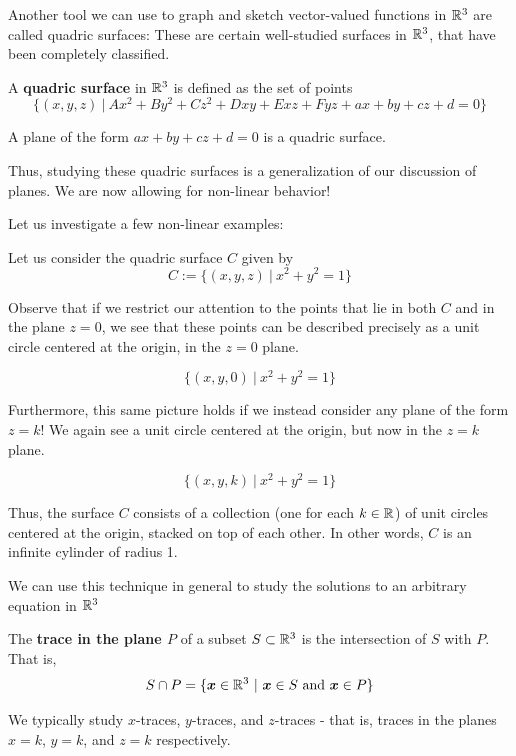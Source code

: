 Another tool we can use to graph and sketch vector-valued functions in $\mathbb{R}^3$ are called quadric surfaces:  These are certain well-studied surfaces in $\mathbb{R}^3$, that have been completely classified.


\begin{definition}
A \textbf{quadric surface} in $\mathbb{R}^3$ is defined as the set of points $$\{ (x, y, z) \ | \ Ax^2 + By^2 + Cz^2 + Dxy + Exz + Fyz + ax + by + cz + d = 0\}$$
\end{definition}

\begin{example}
A plane of the form $ax + by + cz + d = 0$ is a quadric surface.
\end{example}

Thus, studying these quadric surfaces is a generalization of our discussion of planes.  We are now allowing for non-linear behavior!


Let us investigate a few non-linear examples:

\begin{example}
Let us consider the quadric surface $C$ given by  $$C := \{ (x, y, z) \ | \ x^2 + y^2 = 1\}$$

Observe that if we restrict our attention to the points that lie in both $C$ and in the plane $z = 0$, we see that these points can be described precisely as a unit circle centered at the origin, in the $z=0$ plane.

$$\{ (x, y, 0) \ | \ x^2 + y^2 = 1\}$$

Furthermore, this same picture holds if we instead consider any plane of the form $z=k$!  We again see a unit circle centered at the origin, but now in the $z=k$ plane.

$$\{ (x, y, k) \ | \ x^2 + y^2 = 1\}$$

Thus, the surface $C$ consists of a collection (one for each $k \in \mathbb{R}$) of unit circles centered at the origin, stacked on top of each other.  In other words, $C$ is an infinite cylinder of radius 1.
\end{example}


We can use this technique in general to study the solutions to an arbitrary equation in $\mathbb{R}^3$ 

\begin{definition}
    The \textbf{trace in the plane $P$} of a subset $S \subset \mathbb{R}^3$ is the intersection of $S$ with $P$.  That is, 
    $$S \cap P = \{\bm{x} \in \R^3 \ | \ \bm{x} \in S \ \textnormal{and} \ \bm{x} \in P\}$$
    
    We typically study $x$-traces, $y$-traces, and $z$-traces - that is, traces in the planes $x=k$, $y=k$, and $z=k$ respectively.
    
\end{definition}

